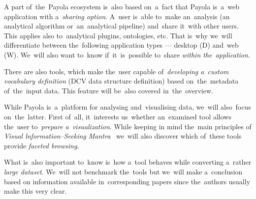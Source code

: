A part of~the~Payola ecosystem is~also based on~a~fact that Payola is~a~web 
application with a~\emph{sharing option}. A~user is~able to~make an~analysis (an
analytical algorithm or~an~analytical pipeline) and~share it~with other users. This applies also to~analytical plugins, ontologies, etc. 
That is~why we~will differentiate between the~following
application types --- desktop (D) and~web (W). We~will also want to~know if~it~is~possible to~share \emph{within the~application}.

There are also tools, which make the~user capable of~\emph{developing a~custom vocabulary 
definition} (DCV data structure definition) based on~the~metadata of~the~input data.
This feature will be~also covered in~the~overview.

While Payola is~a~platform for analysing and~visualising data, we~will also~focus
on~the~latter. First of~all, it~interests us~whether 
an~examined tool allows the~user to~\emph{prepare a~visualization}. While keeping 
in mind the~main principles of \emph{Visual lnformation--Seeking Mantra}~\cite{mantra} we~will also discover 
which of~these tools provide \emph{faceted browsing}.

What is~also important to~know is~how a~tool behaves while converting a~rather 
\emph{large dataset}. We~will not benchmark the~tools but we~will make a~conclusion based 
on information available in~corresponding papers since the~authors usually make 
this very clear.

